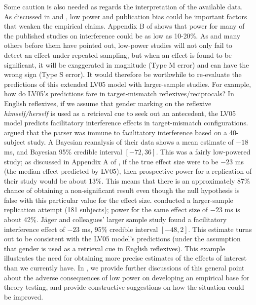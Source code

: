 \documentclass{cambridge7A}\usepackage[]{graphicx}\usepackage[]{color}
\newcommand{\revisedII}[1]{#1}
\begin{document}
\revisedII{Some caution is also needed as regards the interpretation of the available data.} 
As discussed in \cite{JaegerEngelmannVasishth2017} and \cite{VasishthMertzenJaegerGelman2018}, low power and publication bias could be important factors that weaken the empirical claims. Appendix B of \cite{JaegerEngelmannVasishth2017} shows that power for many of the published studies on interference could be as low as 10-20\%. As \cite{GelmanCarlin2014} and many others before them have pointed out, low-power studies will not only fail to detect an effect under repeated sampling, but when an effect is found to be significant, it will be exaggerated in magnitude (Type M error) and can have the wrong sign (Type S error). It would therefore be worthwhile to re-evaluate the predictions of this extended LV05 model with larger-sample studies. 
\revisedII{For example, how do LV05's predictions fare in target-mismatch reflexives/reciprocals? In \index{English reflexives} English reflexives, if we assume that gender marking on the reflexive \textit{himself/herself} is used as a retrieval cue to seek out an antecedent, the LV05 model predicts facilitatory interference effects in target-mismatch configurations. 
\cite{DillonMishlerSloggett2013} argued that the parser was immune to facilitatory interference based on a 40-subject study. A Bayesian reanalysis of their data \citep{JaegerMertzenVanDykeVasishth2019} shows a mean estimate of $-18$ ms, and Bayesian 95\% credible interval $[-72,36]$. This was a fairly low-powered study; as discussed in Appendix A of  \cite{JaegerMertzenVanDykeVasishth2019}, if the true effect size were to be $-23$ ms (the median effect predicted by LV05), then prospective power for a replication of their study would be about 13\%. This means that there is an approximately 87\% chance of obtaining a non-significant result even though the null hypothesis is false with this particular value for the effect size.
\cite{JaegerMertzenVanDykeVasishth2019} conducted a larger-sample replication attempt (181 subjects); power for the same effect size of $-23$ ms is about 42\%.
J\"ager and colleagues' larger sample study found a facilitatory interference effect of $-23$ ms, 95\% credible interval $[-48,2]$. This estimate turns out to be consistent with the LV05 model's predictions (under the assumption that gender is used as a retrieval cue in English reflexives). This example illustrates the need for obtaining more precise estimates of the effects of interest than we currently have. In \cite{VasishthMertzenJaegerGelman2018}, we provide further discussions of this general point about the adverse consequences of low power on developing an empirical base for theory testing, and provide constructive suggestions on how the situation could be improved.}
\end{document}
